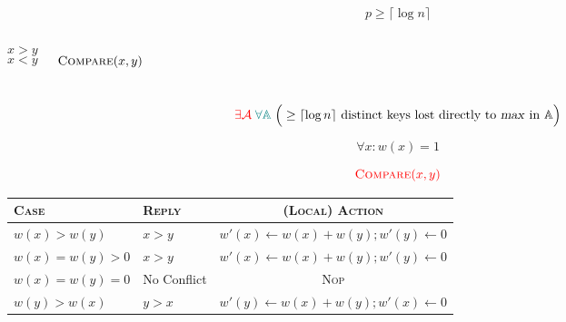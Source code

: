 \begin{frame}{}
  \[
    p \ge \lceil \log n \rceil
  \]

  \pause
  \begin{columns}
      \centerline{}
      \[
	x > y
      \]
      \[
	x < y
      \]
      \centerline{}
      \[
	\textsc{Compare}(x,y)
      \]
  \end{columns}
  
  \pause
  \vspace{0.50cm}
  \[
    \textcolor{red}{\exists \mathcal{A}}\; \textcolor{teal}{\forall \mathbb{A}}\; \Big(\ge \lceil \log n \rceil \text{ distinct keys lost directly to \textsl{max} in } \mathbb{A}\Big) 
  \]
\end{frame}

\begin{frame}{}
\end{frame}

\begin{frame}{}
  \[
    \forall x: w(x) = 1
  \]

  \[
    \textcolor{red}{\textsc{Compare}(x,y)}
  \]
  \renewcommand{\arraystretch}{1.5}
  \begin{center}
    \begin{tabular}{l l c}
      \textsc{Case} & \textsc{Reply} & \textsc{(Local) Action} \\ \hline
      $w(x) > w(y)$ 		& $x > y$	& $w'(x) \gets w(x) + w(y); w'(y) \gets 0$ \\ \hline
      $w(x) = w(y) > 0$ 	& $x > y$	& $w'(x) \gets w(x) + w(y); w'(y) \gets 0$ \\ \hline
      $w(x) = w(y) = 0$ 	& \textsf{No Conflict} & \textsc{Nop} \\ \hline
      $w(y) > w(x)$ 		& $y > x$	& $w'(y) \gets w(x) + w(y); w'(x) \gets 0$ \\ \hline
    \end{tabular}
  \end{center}

  \pause
  \vspace{0.30cm}
  \begin{CJK*}{UTF8}{gbsn}
    \centerline{}
  \end{CJK*}
\end{frame}

